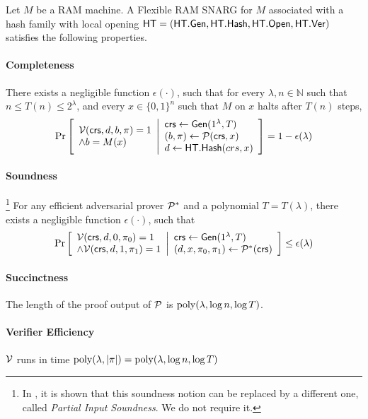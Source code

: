 \begin{definition}
Let $M$ be a RAM machine. A Flexible RAM SNARG for $M$ associated with a hash family with local opening
$\mathsf{HT} = (\mathsf{HT}.\mathsf{Gen}, \mathsf{HT}.\mathsf{Hash}, \mathsf{HT}.\mathsf{Open}, \mathsf{HT}.\mathsf{Ver})$ satisfies the following properties.
\paragraph{Completeness} 
There exists a negligible function $\epsilon(\cdot)$, such that for every $\lambda, n\in \mathbb{N}$ such that $n\leq T(n) \leq 2^\lambda$, and every $x\in \{0,1\}^n$ such that $M$ on $x$ halts after $T(n)$ steps,
\begin{gather*}
    \underset{}{\text{Pr}}\left [
    \begin{array}{ll}
    \mathcal{V}(\mathsf{crs}, d, b, \pi) = 1 \\
    \wedge b = M(x)
    \end{array}
    \middle\vert
    \begin{array}{ll}
    \mathit{ \mathsf{crs} } \leftarrow \mathsf{Gen}(1^\lambda, T) \\
    (b, \pi) \leftarrow \mathcal{P}(\mathsf{crs}, x) \\
    d \leftarrow \mathsf{HT}.\mathsf{Hash}(crs, x)
    \end{array}
    \right ] = 1 - \epsilon(\lambda)
\end{gather*}

\paragraph{Soundness}\footnote{
In \cite{cryptoeprint:2022/1320}, it is shown that this soundness notion can be replaced by a different one, called \emph{Partial Input Soundness}. We do not require it.
}
For any efficient adversarial prover $\mathcal{P}^*$ and a polynomial $T = T(\lambda)$, there exists a negligible function $\epsilon(\cdot)$, such that
\begin{gather*}
    \underset{}{\text{Pr}}\left [
    \begin{array}{ll}
    \mathcal{V}(\mathit{ \mathsf{crs} }, d, 0, \pi_0) = 1 \\
    \wedge \mathcal{V}(\mathsf{crs}, d, 1, \pi_1) = 1
    \end{array}
    \middle\vert
    \begin{array}{ll}
    \mathit{ \mathsf{crs} } \leftarrow \mathsf{Gen}(1^\lambda, T) \\
    (d, x, \pi_0, \pi_1) \leftarrow \mathcal{P}^*(\mathit{ \mathsf{crs} }) \\
    \end{array}
    \right ] \leq \epsilon(\lambda)
\end{gather*}
\paragraph{Succinctness} The length of the proof output of $\mathcal{P}$ is $\operatorname{poly}(\lambda, \log n,\log T)$.
\paragraph{Verifier Efficiency} $\mathcal{V}$ runs in time $\operatorname{poly}(\lambda, |\pi|) = \operatorname{poly}(\lambda, \log n, \log T)$    
\end{definition}


